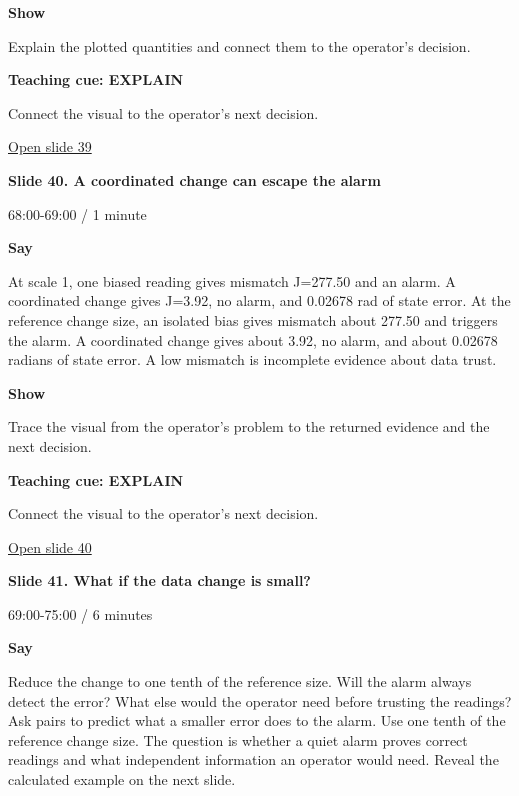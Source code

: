 \documentclass[12pt,letterpaper]{article}
\begin{document}
\textbf{Show}\par Explain the plotted quantities and connect them to the operator's decision.\par\medskip
\textbf{Teaching cue: EXPLAIN}\par Connect the visual to the operator's next decision.\par\medskip
\vfill\href{https://alaaselim-sudo.github.io/GridGuard-Agentic-AI-Tutorials/operator-cases/#/39}{Open slide 39}\par
\clearpage{}
{\Large\bfseries\color{IEEEBlue} Slide 40. A coordinated change can escape the alarm\par}\medskip
{\small\color{Slate} 68:00-69:00 /\allowbreak{} 1 minute\par}\medskip
\textbf{Say}\par At scale 1, one biased reading gives mismatch J=277.50 and an alarm. A coordinated change gives J=3.92, no alarm, and 0.02678 rad of state error. At the reference change size, an isolated bias gives mismatch about 277.50 and triggers the alarm. A coordinated change gives about 3.92, no alarm, and about 0.02678 radians of state error. A low mismatch is incomplete evidence about data trust.\par\medskip
\textbf{Show}\par Trace the visual from the operator's problem to the returned evidence and the next decision.\par\medskip
\textbf{Teaching cue: EXPLAIN}\par Connect the visual to the operator's next decision.\par\medskip
\vfill\href{https://alaaselim-sudo.github.io/GridGuard-Agentic-AI-Tutorials/operator-cases/#/40}{Open slide 40}\par
\clearpage{}
{\Large\bfseries\color{IEEEBlue} Slide 41. What if the data change is small?\par}\medskip
{\small\color{Slate} 69:00-75:00 /\allowbreak{} 6 minutes\par}\medskip
\textbf{Say}\par Reduce the change to one tenth of the reference size. Will the alarm always detect the error? What else would the operator need before trusting the readings? Ask pairs to predict what a smaller error does to the alarm. Use one tenth of the reference change size. The question is whether a quiet alarm proves correct readings and what independent information an operator would need. Reveal the calculated example on the next slide.\par\medskip
\end{document}
